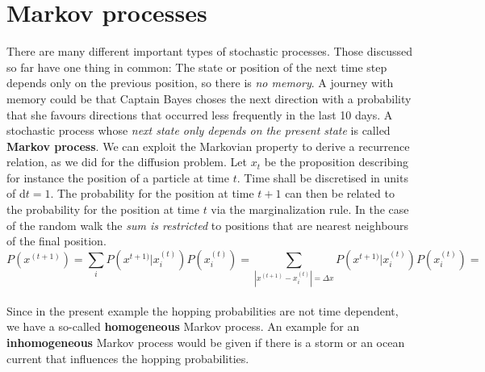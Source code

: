 \documentclass[12pt, a4paper]{scrartcl}
\begin{document}
\section*{Markov processes}
There are many different important types of stochastic processes. Those discussed so far have one thing in common: The state or position of the next time step depends only on the previous position, so there is \textit{no memory}. A journey with memory could be that Captain Bayes choses the next direction with a probability that she favours directions that occurred less frequently in the last 10 days.
A stochastic process whose \textit{next state only depends on the present state} is called \textbf{Markov process}. 
We can exploit the Markovian property to derive a recurrence relation, as we did for the diffusion problem. 
Let $x_t$ be the proposition describing for instance the position of a particle at time $t$. Time shall be discretised in units of d$t=1$. The probability for the position at time $t+1$  can then be related to the probability for the position at time $t$ via the marginalization rule.
In the case of the random walk the \textit{sum is restricted} to positions that are nearest neighbours of the final position.
\begin{equation*}\boxed{P(x^{(t+1)})=\sum_iP(x^{t+1)}|x_i^{(t)})P(x_i^{(t)})=\sum_{|x^{(t+1)}-x_i^{(t)}|=\Delta x}P(x^{t+1)}|x_i^{(t)})P(x_i^{(t)})=
}\end{equation*}\\
Since in the present example the hopping probabilities are not time dependent, we have a so-called \textbf{homogeneous} Markov process.  An example for an \textbf{inhomogeneous} Markov process would be given if there is a storm or an ocean current that influences the hopping probabilities.\\

\\
\end{document}
